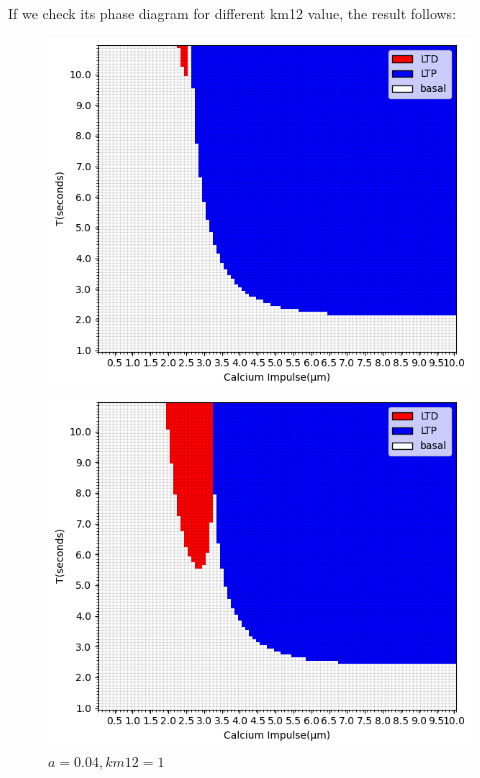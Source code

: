 \documentclass{article}
\begin{document}
If we check its phase diagram for different km12 value, the result follows:
\begin{figure}[h]
    \centering
    \begin{minipage}[b]{0.45\textwidth}
        \includegraphics[width=1.1\textwidth]{a=0.04 km12=0.4.png}
        \caption{$a=0.04, km12=0.4$}
        \label{fig:image1}
    \end{minipage}
    \hfill %
    \begin{minipage}[b]{0.45\textwidth}
        \includegraphics[width=\textwidth]{a=0.04 km12=1.png}
        \caption{$a=0.04, km12=1$}
        \label{fig:image2}
    \end{minipage}
\end{figure}\\
\end{document}
